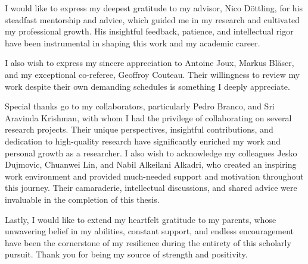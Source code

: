 
 I would like to express my deepest gratitude to my advisor, Nico D\"ottling, for his steadfast mentorship and advice, which guided me in my research and cultivated my professional growth. His insightful feedback, patience, and intellectual rigor have been instrumental in shaping this work and my academic career.

I also wish to express my sincere appreciation to Antoine Joux, Markus Bl\"aser, and my exceptional co-referee, Geoffroy Couteau. Their willingness to review my work despite their own demanding schedules is something I deeply appreciate. 

Special thanks go to my collaborators, particularly Pedro Branco, and Sri Aravinda Krishman, with whom I had the privilege of collaborating on several research projects. Their unique perspectives, insightful contributions, and dedication to high-quality research have significantly enriched my work and personal growth as a researcher.
I also wish to acknowledge my colleagues Jesko Dujmovic, Chuanwei Lin, and Nabil Alkeilani Alkadri, who created an inspiring work environment and provided much-needed support and motivation throughout this journey. Their camaraderie, intellectual discussions, and shared advice were invaluable in the completion of this thesis.

Lastly, I would like to extend my heartfelt gratitude to my parents, whose unwavering belief in my abilities, constant support, and endless encouragement have been the cornerstone of my resilience during the entirety of this scholarly pursuit. Thank you for being my source of strength and positivity.
